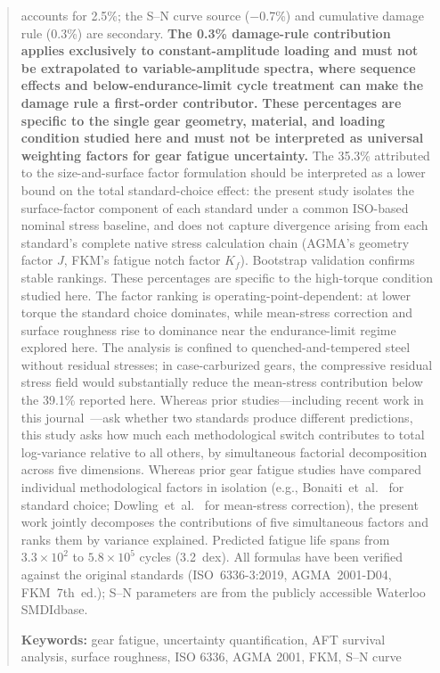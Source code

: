 \documentclass[12pt,a4paper]{article}
\begin{document}
\begin{abstract}
accounts for 2.5\%; the S--N curve source ($-$0.7\%) and cumulative
damage rule (0.3\%) are secondary. \textbf{The 0.3\% damage-rule contribution applies exclusively to
constant-amplitude loading and must not be extrapolated to
variable-amplitude spectra, where sequence effects and
below-endurance-limit cycle treatment can make the damage rule a
first-order contributor.}
\textbf{These percentages are specific to the single gear geometry,
material, and loading condition studied here and must not be
interpreted as universal weighting factors for gear fatigue
uncertainty.} The 35.3\% attributed to the size-and-surface
factor formulation should be interpreted as a lower bound on the total
standard-choice effect: the present study isolates the
surface-factor component of each standard under a common ISO-based
nominal stress baseline, and does not capture divergence arising from
each standard's complete native stress calculation chain (AGMA's
geometry factor $J$, FKM's fatigue notch factor $K_f$). Bootstrap
validation confirms stable
rankings.%
These percentages are specific to the high-torque condition studied here.
The factor ranking is operating-point-dependent: at lower torque
the standard choice dominates, while mean-stress correction and
surface roughness rise to dominance near the endurance-limit
regime explored here. The analysis is confined to quenched-and-tempered
steel without residual stresses; in case-carburized gears, the
compressive residual stress field would substantially reduce the
mean-stress contribution below the 39.1\% reported here. Whereas prior
studies---including recent work in this
journal~\cite{bonaiti2024}---ask whether two standards produce different
predictions, this study asks how much each methodological switch contributes
to total log-variance relative to all others, by simultaneous factorial
decomposition across five dimensions. Whereas prior gear fatigue
studies have compared individual methodological factors in isolation
(e.g., Bonaiti~et~al.~\cite{bonaiti2024} for standard choice; Dowling~et~al.~\cite{dowling2009} for
mean-stress correction), the present work jointly decomposes the
contributions of five simultaneous factors and ranks them by variance
explained. Predicted fatigue life spans from $3.3\times10^2$ to
$5.8\times10^5$ cycles (3.2~dex).%
All formulas have been verified against the original standards (ISO~6336-3:2019, AGMA~2001-D04,
FKM~7th~ed.); S--N parameters are from the publicly accessible Waterloo
SMDIdbase.

\textbf{Keywords:} gear fatigue, uncertainty quantification, AFT survival analysis,
surface roughness, ISO 6336, AGMA 2001, FKM, S--N curve
\end{abstract}
\end{document}
